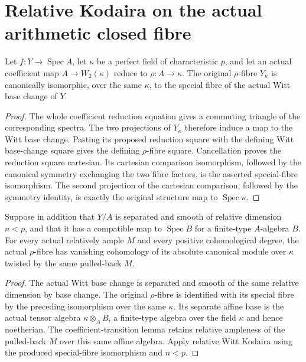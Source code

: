 \section{Relative Kodaira on the actual arithmetic closed fibre}

\begin{lemma}
\label{lem:kn-relative-arithmetic-witt-special-fibre}
\leanok
Let $f:Y\to\operatorname{Spec}A$, let $\kappa$ be a perfect field
of characteristic $p$, and let an actual coefficient map
$A\to W_2(\kappa)$ reduce to $\rho:A\to\kappa$.
The original $\rho$-fibre $Y_\kappa$ is canonically isomorphic,
over the same $\kappa$, to the special fibre of the actual
Witt base change of $Y$.
\end{lemma}
\begin{proof}
The whole coefficient reduction equation gives a commuting
triangle of the corresponding spectra.  The two projections
of $Y_\kappa$ therefore induce a map to the Witt base change.
Pasting its proposed reduction square with the defining Witt
base-change square gives the defining $\rho$-fibre square.
Cancellation proves the reduction square cartesian.  Its
cartesian comparison isomorphism, followed by the canonical
symmetry exchanging the two fibre factors, is the asserted
special-fibre isomorphism.  The second projection of the
cartesian comparison, followed by the symmetry identity, is
exactly the original structure map to $\operatorname{Spec}\kappa$.
\end{proof}

\begin{lemma}
\label{lem:kn-relative-arithmetic-closed-kodaira}
\leanok
Suppose in addition that $Y/A$ is separated and smooth of
relative dimension $n<p$, and that it has a compatible map to
$\operatorname{Spec}B$ for a finite-type $A$-algebra $B$.
For every actual relatively ample $M$ and every positive
cohomological degree, the actual $\rho$-fibre has vanishing
cohomology of its absolute canonical module over $\kappa$
twisted by the same pulled-back $M$.
\end{lemma}
\begin{proof}
The actual Witt base change is separated and smooth of the
same relative dimension by base change.  The original
$\rho$-fibre is identified with its special fibre by the
preceding isomorphism over the same $\kappa$.
Its separate affine base is the actual tensor algebra
$\kappa\otimes_A B$, a finite-type algebra over the field
$\kappa$ and hence noetherian.  The coefficient-transition
lemma retains relative ampleness of the pulled-back $M$ over
this same affine algebra.  Apply relative Witt Kodaira using
the produced special-fibre isomorphism and $n<p$.
\end{proof}
